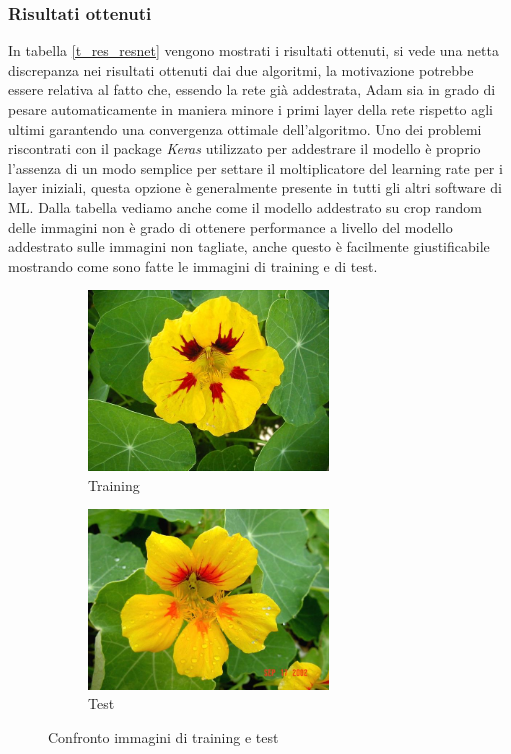 \subsubsection{Risultati ottenuti}
In tabella \ref{t_res_resnet} vengono mostrati i risultati ottenuti, si vede una netta discrepanza nei risultati ottenuti dai due algoritmi, la motivazione potrebbe essere relativa al fatto che, essendo la rete già addestrata, Adam sia in grado di pesare automaticamente in maniera minore i primi layer della rete rispetto agli ultimi garantendo una convergenza ottimale dell'algoritmo.
Uno dei problemi riscontrati con il package \textit{Keras} utilizzato per addestrare il modello è proprio l'assenza di un modo semplice per settare il moltiplicatore del learning rate per i layer iniziali, questa opzione è generalmente presente in tutti gli altri software di ML. Dalla tabella vediamo anche come il modello addestrato su crop random delle immagini non è grado di ottenere performance a livello del modello addestrato sulle immagini non tagliate, anche questo è facilmente giustificabile mostrando come sono fatte le immagini di training e di test.

\begin{figure}[H]
  \begin{subfigure}[b]{0.45\textwidth}
  \centering
    \includegraphics[width=0.7\textwidth]{images/img_train}
    \caption{Training}
  \end{subfigure}
   \hfill
  \begin{subfigure}[b]{0.45\textwidth}
  \centering
    \includegraphics[width=0.7\textwidth]{images/img_test}
    \caption{Test}
  \end{subfigure}
  \caption{Confronto immagini di training e test}
  \vspace{-5mm}
  \label{fig_train_test}
\end{figure}

